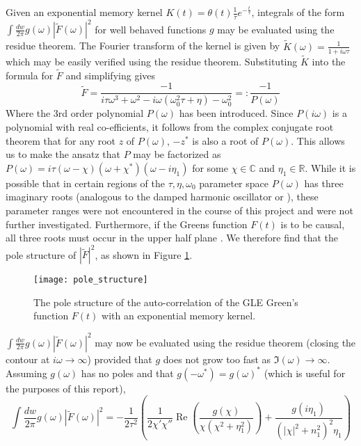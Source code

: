 Given an exponential memory kernel $K(t) = \theta(t) \frac{1}{\tau} e^{-\frac{t}{\tau}}$, integrals of the form $\int\frac{dw}{2\pi} g\left(\omega\right) \left|\tilde{F}\left(\omega\right)\right|^2$ for well behaved functions $g$ may be evaluated using the residue theorem. The Fourier transform of the kernel is given by $\tilde{K}\left(\omega\right) = \frac{1}{1+i\omega\tau}$ which may be easily verified using the residue theorem. Substituting $\tilde{K}$ into the formula for $\tilde{F}$ and simplifying gives
$$
\tilde{F} = \frac{-1}{i\tau\omega^3 + \omega^2 - i\omega(\omega_0^2\tau + \eta) - \omega_0^2} =: \frac{-1}{P(\omega)}
$$
Where the 3rd order polynomial $P(\omega)$ has been introduced. Since $P(i\omega)$ is a polynomial with real co-efficients, it follows from the complex conjugate root theorem that for any root $z$ of $P(\omega)$, $-z^*$ is also a root of $P(\omega)$. This allows us to make the ansatz that $P$ may be factorized as $P(\omega) = i\tau\left(\omega - \chi\right)\left(\omega + \chi^*\right)\left(\omega - i\eta_1\right)$ for some $\chi\in\mathbb{C}$ and ${\eta_1\in\mathbb{R}}$. While it is possible that in certain regions of the $\tau,\eta,\omega_0$ parameter space $P(\omega)$ has three imaginary roots (analogous to the damped harmonic oscillator or \cite{Townsend_2018}), these parameter ranges were not encountered in the course of this project and were not further investigated. Furthermore, if the Greens function $F(t)$ is to be causal, all three roots must occur in the upper half plane \cite{Runkel}. We therefore find that the pole structure of $\left|\tilde{F}\right|^2$, as shown in Figure \ref{fig:pole_structure}. 
\\
\begin{figure}
	\centering
	\texttt{[image: pole\_structure]}
	\caption{\label{fig:pole_structure} The pole structure of the auto-correlation of the GLE Green's function $F(t)$ with an exponential memory kernel.}
\end{figure}

$\int\frac{dw}{2\pi} g\left(\omega\right) \left|\tilde{F}\left(\omega\right)\right|^2$ may now be evaluated using the residue theorem (closing the contour at $i\omega\rightarrow\infty$) provided that $g$ does not grow too fast as $\Im(\omega)\rightarrow\infty$. Assuming $g(\omega)$ has no poles and that $g(-\omega^*)=g(\omega)^*$ (which is useful for the purposes of this report),
\begin{equation}
	\int\frac{dw}{2\pi} g\left(\omega\right) \left|\tilde{F}\left(\omega\right)\right|^2 =  -\frac{1}{2 \tau^{2}}\left(\frac{1}{2 \chi' \chi''} \operatorname{Re}\left(\frac{g(\chi)}{\chi\left(\chi^{2}+\eta_{1}^{2}\right)}\right)+\frac{g(i\eta_{1})}{\left(|\chi|^{2}+n_{1}^{2}\right)^{2} \eta_{1}}\right) \label{eqn:integral_over_CF}
\end{equation}

